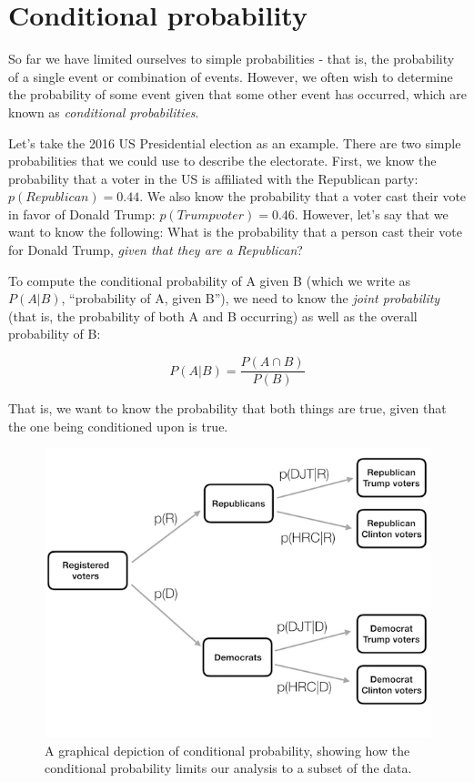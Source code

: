 \documentclass[
  12pt,
]{book}
\begin{document}
\hypertarget{conditional-probability}{%
\section{Conditional probability}\label{conditional-probability}}

So far we have limited ourselves to simple probabilities - that is, the probability of a single event or combination of events. However, we often wish to determine the probability of some event given that some other event has occurred, which are known as \emph{conditional probabilities}.

Let's take the 2016 US Presidential election as an example. There are two simple probabilities that we could use to describe the electorate. First, we know the probability that a voter in the US is affiliated with the Republican party: \(p(Republican) = 0.44\). We also know the probability that a voter cast their vote in favor of Donald Trump: \(p(Trump voter)=0.46\). However, let's say that we want to know the following: What is the probability that a person cast their vote for Donald Trump, \emph{given that they are a Republican}?

To compute the conditional probability of A given B (which we write as \(P(A|B)\), ``probability of A, given B''), we need to know the \emph{joint probability} (that is, the probability of both A and B occurring) as well as the overall probability of B:

\[
P(A|B) = \frac{P(A \cap B)}{P(B)}
\]

That is, we want to know the probability that both things are true, given that the one being conditioned upon is true.

\begin{figure}
\includegraphics[width=8in,height=0.5\textheight]{images/conditional_probability} \caption{A graphical depiction of conditional probability, showing how the conditional probability limits our analysis to a subset of the data.}\label{fig:conditionalProbability}
\end{figure}
\end{document}
